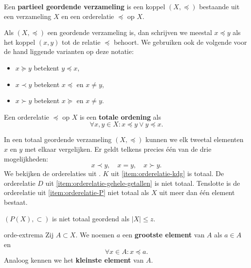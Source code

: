 \begin{definitie}{}{}
    Een \textbf{partieel geordende verzameling} is een koppel $(X, \preceq)$ bestaande uit een verzameling $X$ en een orderelatie $\preceq$ op $X$.
\end{definitie}
Als $(X, \preceq)$ een geordende verzameling is, dan schrijven we meestal $x \preceq y$ als het koppel $(x,y)$ tot de relatie $\preceq$ behoort.
We gebruiken ook de volgende voor de hand liggende varianten op deze notatie:
\begin{itemize}
    \item $x \succeq y$ betekent $y \preceq x$,
    \item $x \prec y$ betekent $x \preceq$ en $x \neq y$,
    \item $x \succ y$ betekent $x \succeq$ en $x \neq y$.
\end{itemize}

\begin{definitie}{}{}
    Een orderelatie $\preceq$ op $X$ is een \textbf{totale ordening} als
    \[
        \forall x,y \in X: x \preceq y \lor y \preceq x.
    \]
\end{definitie}
In een totaal geordende verzameling $(X, \preceq)$ kunnen we elk tweetal elementen $x$ en $y$ met elkaar vergelijken.
Er geldt telkens precies één van de drie mogelijkheden:
\[
    x \prec y, \quad x = y, \quad x \succ y.
\]
We bekijken de orderelaties uit .
$K$ uit \cref{item:orderelatie-kdg} is totaal.
De orderelatie $D$ uit \cref{item:orderelatie-gehele-getallen} is niet totaal.
Tenslotte is de orderelatie uit \cref{item:orderelatie-P} niet totaal als $X$ uit meer dan één element bestaat.
\begin{voorbeeld}{}{}
    \( (P(X), \subset) \) is niet totaal geordend als \( \lvert X\rvert \leq z \).
\end{voorbeeld}

\begin{definitie}{}{orde-extrema}
    Zij $A \subset X$.
    We noemen $a$ een \textbf{grootste element}
    van $A$ als $a \in A$ en
    \[
        \forall x\in A: x \preceq a.
    \]
    Analoog kennen we het \textbf{kleinste element} van $A$.
\end{definitie}

